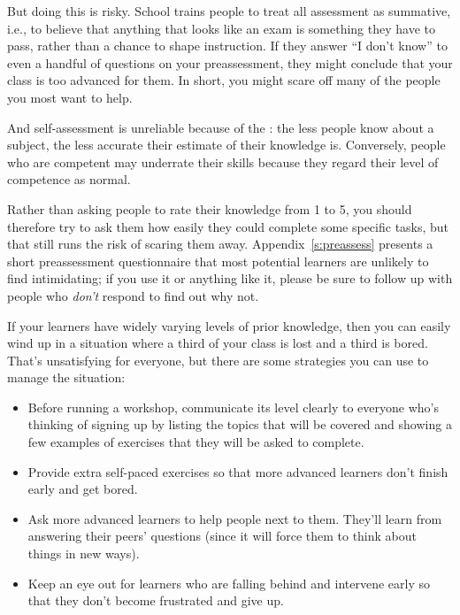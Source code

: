 But doing this is risky. School trains people to treat all assessment as
summative, i.e., to believe that anything that looks like an exam is
something they have to pass, rather than a chance to shape instruction.
If they answer ``I don't know'' to even a handful of questions on your
preassessment, they might conclude that your class is too advanced for
them. In short, you might scare off many of the people you most want to
help.

And self-assessment is unreliable because of the  \cite{Krug1999}: the less people know
about a subject, the less accurate their estimate of their knowledge
is. Conversely, people who are competent may underrate their skills
because they regard their level of competence as normal.

Rather than asking people to rate their knowledge from 1 to 5, you
should therefore try to ask them how easily they could complete some
specific tasks, but that still runs the risk of scaring them away.
Appendix~\ref{s:preassess} presents a short preassessment questionnaire
that most potential learners are unlikely to find intimidating; if you
use it or anything like it, please be sure to follow up with people who
\emph{don't} respond to find out why not.


If your learners have widely varying levels of prior knowledge, then you
can easily wind up in a situation where a third of your class is lost
and a third is bored. That's unsatisfying for everyone, but there are
some strategies you can use to manage the situation:

\begin{itemize}
\item
  Before running a workshop, communicate its level clearly to everyone
  who's thinking of signing up by listing the topics that will be
  covered and showing a few examples of exercises that they will be
  asked to complete.
\item
  Provide extra self-paced exercises so that more advanced learners
  don't finish early and get bored.
\item
  Ask more advanced learners to help people next to them. They'll
  learn from answering their peers' questions (since it will force
  them to think about things in new ways).
\item
  Keep an eye out for learners who are falling behind and intervene
  early so that they don't become frustrated and give up.
\end{itemize}

